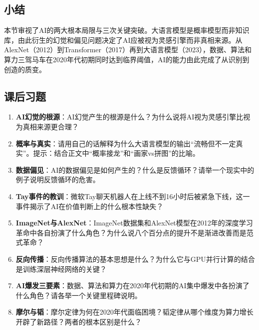 \bigskip
\subsection*{小结}

本节审视了AI的两大根本局限与三次关键突破。大语言模型是概率模型而非知识库，由此衍生的幻觉和偏见问题决定了AI应被视为灵感引擎而非真相来源。从AlexNet（2012）到Transformer（2017）再到大语言模型（2023），数据、算法和算力三驾马车在2020年代初期同时达到临界阈值，AI的能力由此完成了从识别到创造的质变。

\bigskip
\subsection*{课后习题}
\begin{enumerate}
\setlength{\itemsep}{6pt}

\item \textbf{AI幻觉的根源}：AI幻觉产生的根源是什么？为什么说将AI视为灵感引擎比视为真相来源更合理？

\item \textbf{概率与真实}：请用自己的话解释为什么大语言模型的输出``流畅但不一定真实''。提示：结合正文中``概率接龙''和``画家vs拼图''的比喻。

\item \textbf{数据偏见}：AI的数据偏见是如何产生的？什么是反馈循环？请举一个现实中的例子说明反馈循环的危害。

\item \textbf{Tay事件的教训}：微软Tay聊天机器人在上线不到16小时后被紧急下线，这一事件揭示了AI在价值判断上的什么根本性缺失？

\item \textbf{ImageNet与AlexNet}：ImageNet数据集和AlexNet模型在2012年的深度学习革命中各自扮演了什么角色？为什么说八个百分点的提升不是渐进改善而是范式革命？

\item \textbf{反向传播}：反向传播算法的基本思想是什么？为什么它与GPU并行计算的结合是训练深层神经网络的关键？

\item \textbf{AI爆发三要素}：数据、算法和算力在2020年代初期的AI集中爆发中各扮演了什么角色？请各举一个关键里程碑说明。

\item \textbf{摩尔与韬}：摩尔定律为何在2020年代面临困境？韬定律从哪个维度为算力增长开辟了新路径？两者的根本区别是什么？

\end{enumerate}

